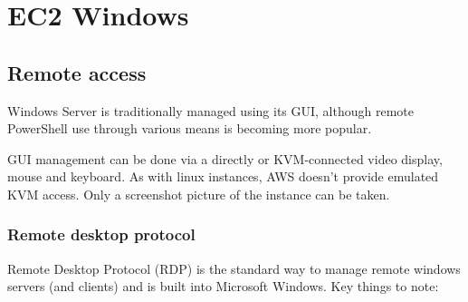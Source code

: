 \chapter{EC2 Windows}
\label{ch:ec2-windows}

\section{Remote access}

Windows Server is traditionally managed using its GUI, although remote
PowerShell use through various means is becoming more popular.

GUI management can be done via a directly or KVM-connected video
display, mouse and keyboard. As with linux instances, AWS doesn't
provide emulated KVM access. Only a screenshot picture of the instance
can be taken.

\subsection{Remote desktop protocol}\label{remote-desktop-protocol}

Remote Desktop Protocol
(RDP) is the standard way to manage remote windows servers (and clients)
and is built into Microsoft Windows. Key things to note:

